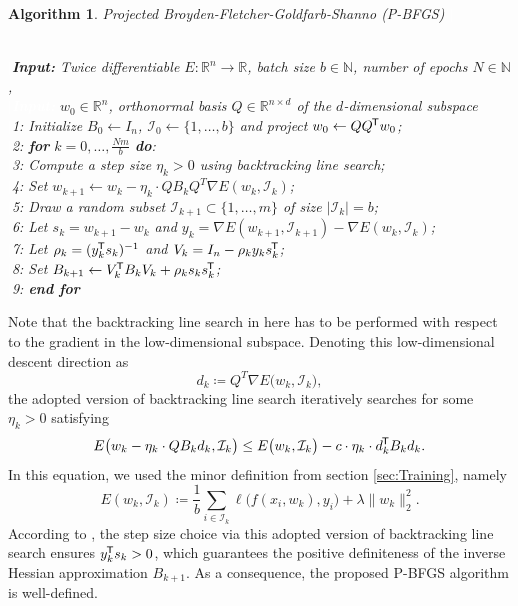 \documentclass[11pt, a4paper]{article}
\newtheorem{algorithm}[theorem]{Algorithm}
\newcommand{\N}{\mathbb{N}}
\newcommand{\R}{\mathbb{R}}
\newcommand{\I}{\mathcal{I}}
\newcommand*{\tr}{^{\mkern-1.5mu\mathsf{T}}}
\begin{document}
\begin{algorithm}
\caption{Projected Broyden-Fletcher-Goldfarb-Shanno (P-BFGS) \textcolor{white}{$\Big |$}} \ \\
\textcolor{white}{$\Big |$}\textbf{Input:} Twice differentiable $E: \R^n \to \R$, batch size $b \in \N$, number of epochs $N \in \N$, \\
\textcolor{white}{$\Big |$\textbf{Input:}} $w_0 \in \R^n$, orthonormal basis $Q \in \R^{n \times d}$ of the $d$-dimensional subspace \\
\textcolor{white}{$\Big |$}1: Initialize $B_0 \leftarrow I_n$, $\I_0 \leftarrow \{ 1, \dots, b\}$ and project $w_0 \leftarrow QQ\tr w_0$; \\
\textcolor{white}{$\Big |$}2: \textbf{for} $k=0, \dots, \frac{Nm}{b}$ \textbf{do}: \\
\textcolor{white}{$\Big |$}3: \quad Compute a step size $\eta_k > 0$ using backtracking line search; \\
\textcolor{white}{$\Big |$}4: \quad Set $w_{k+1} \leftarrow w_k - \eta_k \cdot Q B_k Q^T \nabla E(w_k,\I_k)$; \\
\textcolor{white}{$\Big |$}5: \quad Draw a random subset $\I_{k+1} \subset \{1, \dots, m \}$ of size $| \I_k | = b$; \\
\textcolor{white}{$\Big |$}6: \quad Let $s_k = w_{k+1} - w_{k}$ and $y_k = \nabla E(w_{k+1}, \I_{k+1}) - \nabla E(w_{k}, \I_{k})$; \\
\textcolor{white}{$\Big |$}7: \quad Let $\rho_k = (y_k\tr s_k)^{-1}$ and $V_k = I_n - \rho_k y_k s_k\tr $; \\
\textcolor{white}{$\Big |$}8: \quad Set $B_{k+1} \leftarrow V_k\tr B_{k}V_k + \rho_k s_k s_k\tr $; \\
\textcolor{white}{$\Big |$}9: \textbf{end for}
\end{algorithm}

Note that the backtracking line search in here has to be performed with respect to the gradient in the low-dimensional subspace. Denoting this low-dimensional descent direction as
\[ d_k \coloneq Q^T \nabla E \big (w_k,\I_k \big), \] 
the adopted version of backtracking line search iteratively searches for some $\eta_k > 0$ satisfying 
\[ E \big (w_k - \eta_k \cdot Q B_k d_k, \I_k \big) \leq E \big (w_k, \I_k \big ) - c \cdot \eta_k \cdot d_k \tr B_k d_k. \]
In this equation, we used the minor definition from section \ref{sec:Training}, namely 
\[ E(w_k,\I_k) \coloneq \frac{1}{b} \sum_{i \in \I_k}^{}  \ell \big ( f(x_i,w_k),y_i \big) + \lambda \big \| w_k \big \|_2^2. \]
According to \cite{Paper}, the step size choice via this adopted version of backtracking line search ensures $y_k \tr s_k > 0$, which guarantees the positive definiteness of the inverse Hessian approximation $B_{k+1}$. As a consequence, the proposed P-BFGS algorithm is well-defined. 
\end{document}
